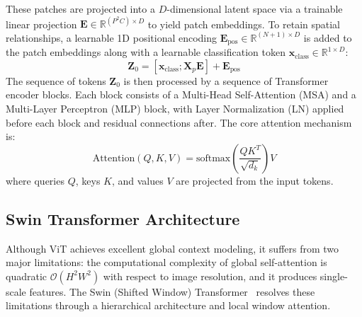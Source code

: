 \documentclass[11pt, a4paper]{article}
\begin{document}
These patches are projected into a $D$-dimensional latent space via a trainable linear projection $\mathbf{E} \in \mathbb{R}^{(P^2 C) \times D}$ to yield patch embeddings. To retain spatial relationships, a learnable 1D positional encoding $\mathbf{E}_{\text{pos}} \in \mathbb{R}^{(N+1) \times D}$ is added to the patch embeddings along with a learnable classification token $\mathbf{x}_{\text{class}} \in \mathbb{R}^{1 \times D}$:
\begin{equation}\label{eq:vit_embedding}
    \mathbf{Z}_0 = [\mathbf{x}_{\text{class}}; \mathbf{X}_p \mathbf{E}] + \mathbf{E}_{\text{pos}}
\end{equation}
The sequence of tokens $\mathbf{Z}_0$ is then processed by a sequence of Transformer encoder blocks. Each block consists of a Multi-Head Self-Attention (MSA) and a Multi-Layer Perceptron (MLP) block, with Layer Normalization (LN) applied before each block and residual connections after. The core attention mechanism is:
\begin{equation}\label{eq:self_attention}
    \text{Attention}(Q, K, V) = \text{softmax}\left(\frac{QK^T}{\sqrt{d_k}}\right)V
\end{equation}
where queries $Q$, keys $K$, and values $V$ are projected from the input tokens.

\subsection{Swin Transformer Architecture}

Although ViT achieves excellent global context modeling, it suffers from two major limitations: the computational complexity of global self-attention is quadratic $\mathcal{O}(H^2 W^2)$ with respect to image resolution, and it produces single-scale features. The Swin (Shifted Window) Transformer~\cite{liu2021swin} resolves these limitations through a hierarchical architecture and local window attention.
\end{document}
